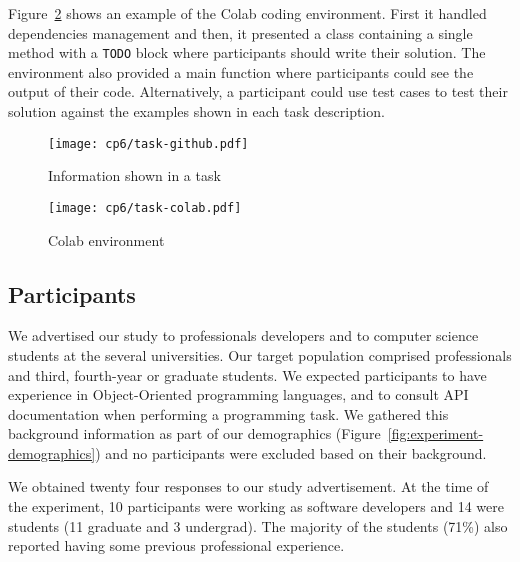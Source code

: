 Figure~\ref{fig:nytimes-task-colab} shows an example of the Colab coding environment. 
First it handled dependencies management and then, 
it presented a class containing a single method with a \texttt{TODO} block where 
participants should write their solution. 
The environment also provided a main function where participants could see the output
of their code. Alternatively, a participant could use test cases to test their solution
against the examples shown in each task description.



\clearpage

\begin{figure}
    \centering
    \texttt{[image: cp6/task-github.pdf]}
    \caption{Information shown in a task}
    \label{fig:nytimes-task-github}
\end{figure}



\clearpage

\begin{figure}
    \centering
    \texttt{[image: cp6/task-colab.pdf]}
    \caption{Colab environment}
    \label{fig:nytimes-task-colab}
\end{figure}



\clearpage



\subsection{Participants}
\label{cp6:participants}


We advertised our study to professionals developers and to computer science students at the several universities. 
Our target population comprised professionals and third, fourth-year or graduate students.
We expected participants to have experience in Object-Oriented programming languages, and to consult API documentation when performing a programming task.
We gathered this background information as part of our demographics (Figure~\ref{fig:experiment-demographics})
and no participants were excluded
based on their background.






We obtained twenty four responses to our study advertisement. 
At the time of the experiment, 10 participants were working as software
developers and 14 were students (11 graduate and 3 undergrad).
The majority of the students (71\%) also reported having some previous professional experience.


